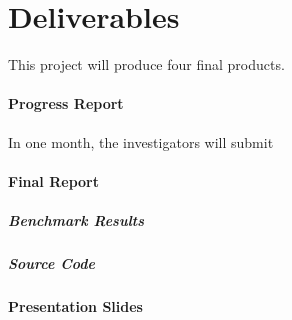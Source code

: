 \section{Deliverables}
  This project will produce four final products.
  \paragraph{Progress Report} In one month, the investigators will submit
  \paragraph{Final Report}
    \subparagraph{Benchmark Results}
    \subparagraph{Source Code}
  \paragraph{Presentation Slides}